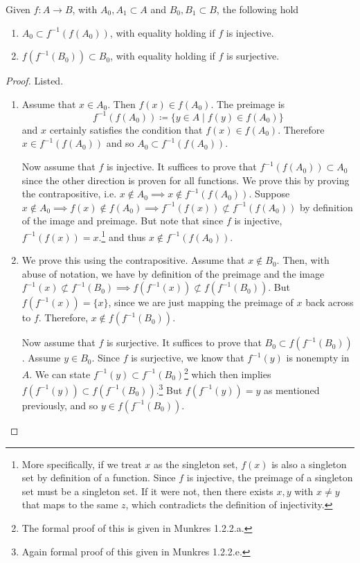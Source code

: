   \begin{theorem}
    \label{thm:preserve_back_forth}
    Given $f: A \rightarrow B$, with $A_0, A_1 \subset A$ and $B_0, B_1 \subset B$, the following hold 
    \begin{enumerate}
      \item $A_0 \subset f^{-1} (f(A_0))$, with equality holding if $f$ is injective. 
      \item $f(f^{-1}(B_0)) \subset B_0$, with equality holding if $f$ is surjective. 
    \end{enumerate}
  \end{theorem} 
  \begin{proof} 
    Listed. 
    \begin{enumerate}
      \item Assume that $x \in A_0$. Then $f(x) \in f(A_0)$. The preimage is 
      \begin{equation}
        f^{-1} (f(A_0)) \coloneqq \{ y \in A \mid f(y) \in f(A_0) \}
      \end{equation}
      and $x$ certainly satisfies the condition that $f(x) \in f(A_0)$. Therefore $x \in f^{-1} (f(A_0))$ and so $A_0 \subset f^{-1} (f(A_0))$. 

      Now assume that $f$ is injective. It suffices to prove that $f^{-1} (f(A_0)) \subset A_0$ since the other direction is proven for all functions. We prove this by proving the contrapositive, i.e. $x \not\in A_0 \implies x \not\in f^{-1} (f(A_0))$. Suppose $x \not\in A_0 \implies f(x) \not\in f(A_0) \implies f^{-1} (f(x)) \not\subset f^{-1} (f(A_0))$ by definition of the image and preimage. But note that since $f$ is injective, $f^{-1} (f(x)) = x$.\footnote{More specifically, if we treat $x$ as the singleton set, $f(x)$ is also a singleton set by definition of a function. Since $f$ is injective, the preimage of a singleton set must be a singleton set. If it were not, then there exists $x, y$ with $x \neq y$ that maps to the same $z$, which contradicts the definition of injectivity.} and thus $x \not\in f^{-1} (f(A_0))$. 

      \item We prove this using the contrapositive. Assume that $x \not\in B_0$. Then, with abuse of notation, we have by definition of the preimage and the image $f^{-1} (x) \not\subset f^{-1} (B_0) \implies f(f^{-1} (x)) \not\subset f(f^{-1}(B_0))$. But $f (f^{-1} (x)) = \{x\}$, since we are just mapping the preimage of $x$ back across to $f$. Therefore, $x \notin f( f^{-1} (B_0))$. 

      Now assume that $f$ is surjective. It suffices to prove that $B_0 \subset f (f^{-1}(B_0))$. Assume $y \in B_0$. Since $f$ is surjective, we know that $f^{-1} (y)$ is nonempty in $A$. We can state $f^{-1}(y) \subset f^{-1} (B_0)$\footnote{The formal proof of this is given in Munkres 1.2.2.a.} which then implies $f(f^{-1} (y)) \subset f (f^{-1} (B_0))$.\footnote{Again formal proof of this given in Munkres 1.2.2.e.} But $f (f^{-1} (y)) = y$ as mentioned previously, and so $y \in f(f^{-1} (B_0))$. 
    \end{enumerate}
  \end{proof}

